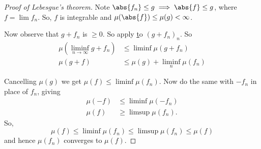 \documentclass{article}
\newcommand{\1}[1]{\mathbbm{1}_{#1}}
\begin{document}

\begin{proof}[Proof of Lebesgue's theorem]
    Note $\abs{f_n} \leq g \implies \abs{f} \leq g$, where $f = \lim f_n$. So, $f$ is integrable and $\mu(\abs{f}) \leq \mu(g) < \infty$.

    Now observe that $g + f_n$ is $\geq 0$. So apply \hyperlink{thm:fatou} to $(g + f_n)_n$. So
    \begin{align*}
        \mu(\liminf_{n \to \infty} g + f_n) &\leq \liminf \mu(g + f_n) \\
        \mu(g + f) &\leq \mu(g) + \liminf_n \mu(f_n)
    \end{align*}

    Cancelling $\mu(g)$ we get $\mu(f) \leq \liminf \mu(f_n)$. Now do the same with $-f_n$ in place of $f_n$, giving
    \begin{align*}
        \mu(-f) &\leq \liminf \mu(-f_n) \\
        \mu(f) &\geq \limsup \mu(f_n).
    \end{align*}
    So,
    \begin{equation*}
        \mu(f) \leq \liminf \mu(f_n) \leq \limsup \mu(f_n) \leq \mu(f)
    \end{equation*}
    and hence $\mu(f_n)$ converges to $\mu(f)$.
\end{proof}
\end{document}
